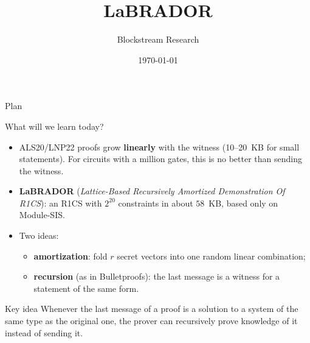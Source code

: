 \documentclass{zkdl-presentation-template}
\title[LaBRADOR]{\textbf{LaBRADOR}}
\author{Blockstream Research}
\date{\today}
\begin{document}
    \maketitleframe

    \begin{frame}{Plan}
      \tableofcontents[hideallsubsections]
    \end{frame}

    \begin{frame}{What will we learn today?}
        \begin{itemize}
            \item ALS20/LNP22 proofs grow \textbf{linearly} with the witness (10--20~KB for small statements). For circuits with a million gates, this is no better than sending the witness.\pause
            \item \textbf{LaBRADOR} (\emph{Lattice-Based Recursively Amortized Demonstration Of R1CS}): an R1CS with $2^{20}$ constraints in about $58$~KB, based only on Module-SIS.\pause
            \item Two ideas:
            \begin{itemize}
                \item \textbf{amortization}: fold $r$ secret vectors into one random linear combination;
                \item \textbf{recursion} (as in Bulletproofs): the last message is a witness for a statement of the same form.
            \end{itemize}
        \end{itemize}
        \pause

        \begin{remarkblock}{Key idea}
            Whenever the last message of a proof is a solution to a system of the same type as the original one, the prover can recursively prove knowledge of it instead of sending it.
        \end{remarkblock}
    \end{frame}
\end{document}
